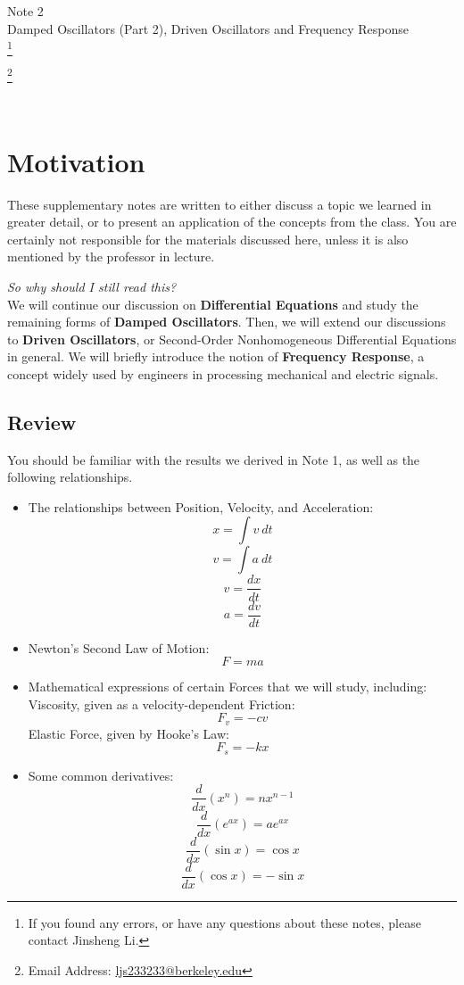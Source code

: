 \documentclass[11pt]{article}
\newcommand\blfootnote[1]{
    \begingroup
    \renewcommand\thefootnote{}\footnote{#1}
    \addtocounter{footnote}{-1}
    \endgroup
}
\theoremstyle{gangnamstyle}{\newtheorem{definition}{Definition}[]}
\theoremstyle{gangnamstyle}{\newtheorem{example}{Example}[]}
\theoremstyle{gangnamstyle}{\newtheorem{problem}{Problem}[]}
\theoremstyle{gangnamstyle}{\newtheorem{warning}{Warning}[]}
\begin{document}
\normalfont
\pagestyle{pages}


\begin{center}
\vspace{3in}
{\Large Note 2} \\[0.05in]
Damped Oscillators (Part 2), Driven Oscillators and Frequency Response  \\ 
\blfootnote{If you found any errors, or have any questions about these notes, please contact Jinsheng Li.} \blfootnote{Email Address: \href{mailto:ljs233233@berkeley.edu}{ljs233233@berkeley.edu}} \\ [-0.5in]
\end{center}

\section*{Motivation}

These supplementary notes are written to either discuss a topic we learned in greater detail, or to present an application of the concepts from the class. You are certainly not responsible for the materials discussed here, unless it is also mentioned by the professor in lecture. 

\textit{So why should I still read this?} \\
We will continue our discussion on \textbf{Differential Equations} and study the remaining forms of \textbf{Damped Oscillators}. Then, we will extend our discussions to \textbf{Driven Oscillators}, or Second-Order Nonhomogeneous Differential Equations in general. We will briefly introduce the notion of \textbf{Frequency Response}, a concept widely used by engineers in processing mechanical and electric signals. 

\subsection*{Review}

You should be familiar with the results we derived in Note 1, as well as the following relationships. 

\begin{itemize}
\item The relationships between Position, Velocity, and Acceleration: 
\[ x = \int v \ dt \]
\[ v = \int a \ dt \]
\[ v = \frac{dx}{dt}\]
\[ a = \frac{dv}{dt} \]
\item Newton's Second Law of Motion: 
\[ F = ma \]
\item Mathematical expressions of certain Forces that we will study, including: \\
Viscosity, given as a velocity-dependent Friction: 
\[ F_v = -cv \]
Elastic Force, given by Hooke's Law: 
\[ F_s = -kx \]
\item Some common derivatives: 
\[ \frac{d}{dx}(x^n) = nx^{n - 1} \]
\[ \frac{d}{dx}(e^{ax}) = ae^{ax} \]
\[ \frac{d}{dx}(\sin x) = \cos x \]
\[ \frac{d}{dx}(\cos x) = -\sin x \]
\end{itemize}
\pagebreak
\end{document}

